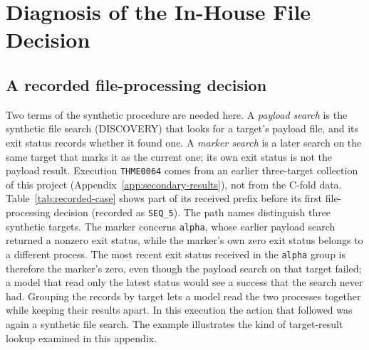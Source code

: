 \chapter{Diagnosis of the In-House File Decision}
\label{app:diagnosis}

\section{A recorded file-processing decision}
\label{sec:recorded-case}

Two terms of the synthetic procedure are needed here. A \emph{payload
search} is the synthetic file search (DISCOVERY) that looks for a
target's payload file, and its exit status records whether it found
one. A \emph{marker search} is a later search on the same target that
marks it as the current one; its own exit status is not the payload
result. Execution \texttt{THME0064} comes from an earlier three-target
collection of this project (Appendix~\ref{app:secondary-results}), not
from the C-fold data. Table~\ref{tab:recorded-case} shows part of its
received prefix before its first file-processing decision
(recorded as \texttt{SEQ\_5}). The path
names distinguish three synthetic targets. The marker concerns
\texttt{alpha}, whose earlier payload search returned a nonzero exit
status, while the marker's own zero exit status belongs to a different
process. The most recent exit status received in the \texttt{alpha}
group is therefore the marker's zero, even though the payload search
on that target failed; a model that read only the latest status would
see a success that the search never had. Grouping the records by
target lets a model read the two processes together while keeping
their results apart. In this execution the action that followed was
again a synthetic file search. The example illustrates the kind of
target-result lookup examined in this appendix.

